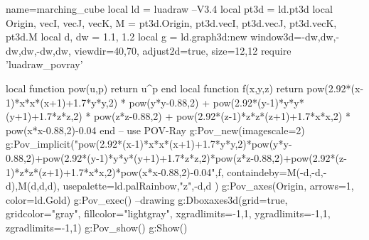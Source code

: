 \documentclass[border=5pt]{standalone}%
\begin{document}
\begin{luadraw}{name=marching_cube}
local ld = luadraw --V3.4
local pt3d = ld.pt3d
local Origin, vecI, vecJ, vecK, M = pt3d.Origin, pt3d.vecI, pt3d.vecJ, pt3d.vecK, pt3d.M
local d, dw = 1.1, 1.2
local g = ld.graph3d:new{ window3d={-dw,dw,-dw,dw,-dw,dw}, viewdir={40,70}, adjust2d=true, size={12,12} }
require 'luadraw_povray'

local function pow(u,p) return u^p end
local function f(x,y,z)
    return pow(2.92*(x-1)*x*x*(x+1)+1.7*y*y,2) * pow(y*y-0.88,2) + pow(2.92*(y-1)*y*y*(y+1)+1.7*z*z,2) * pow(z*z-0.88,2) + pow(2.92*(z-1)*z*z*(z+1)+1.7*x*x,2) * pow(x*x-0.88,2)-0.04
end
-- use POV-Ray
g:Pov_new({imagescale=2})
g:Pov_implicit("pow(2.92*(x-1)*x*x*(x+1)+1.7*y*y,2)*pow(y*y-0.88,2)+pow(2.92*(y-1)*y*y*(y+1)+1.7*z*z,2)*pow(z*z-0.88,2)+pow(2.92*(z-1)*z*z*(z+1)+1.7*x*x,2)*pow(x*x-0.88,2)-0.04",f, 
    {containdeby={M(-d,-d,-d),M(d,d,d)}, usepalette={ld.palRainbow,"z",{-d,d}} })
g:Pov_axes(Origin, {arrows=1, color=ld.Gold})
g:Pov_exec()
--drawing
g:Dboxaxes3d({grid=true, gridcolor="gray", fillcolor="lightgray", xgradlimits={-1,1}, ygradlimits={-1,1}, zgradlimits={-1,1}})
g:Pov_show() 
g:Show()
\end{luadraw}
\end{document}
